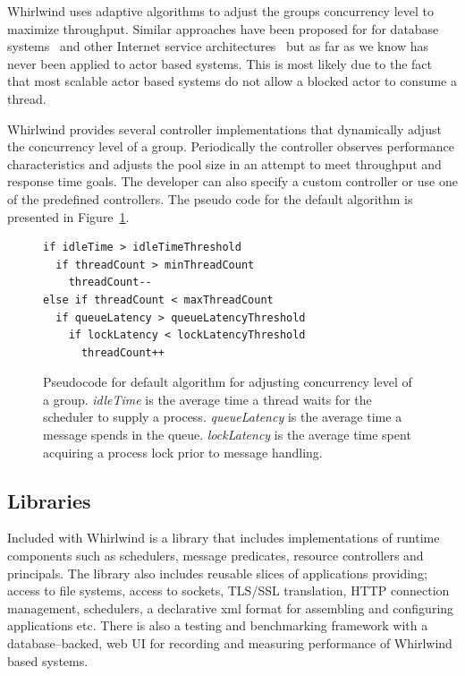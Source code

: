 \documentclass[conference]{IEEEtran}
\begin{document}
Whirlwind uses adaptive algorithms to adjust the groups concurrency level to maximize throughput. Similar approaches have been proposed for for database systems~\cite{Heiss:91:AdaptiveLoadControl} and other Internet service architectures~\cite{welsh03Adaptive} but as far as we know has never been applied to actor based systems. This is most likely due to the fact that most scalable actor based systems do not allow a blocked actor to consume a thread.

Whirlwind provides several controller implementations that dynamically adjust the concurrency level of a group. Periodically the controller observes performance characteristics and adjusts the pool size in an attempt to meet throughput and response time goals. The developer can also specify a custom controller or use one of the predefined controllers. The pseudo code for the default algorithm is presented in Figure~\ref{figure:epc}. 

\begin{figure}[ht]
\begin{verbatim}
if idleTime > idleTimeThreshold
  if threadCount > minThreadCount
    threadCount--
else if threadCount < maxThreadCount
  if queueLatency > queueLatencyThreshold
    if lockLatency < lockLatencyThreshold
      threadCount++
\end{verbatim}
\caption{Pseudocode for default algorithm for adjusting concurrency level of a group. \emph{idleTime} is the average time a thread waits for the scheduler to supply a process. \emph{queueLatency} is the average time a message spends in the queue. \emph{lockLatency} is the average time spent acquiring a process lock prior to message handling.}
\label{figure:epc}
\end{figure} 

\subsection{Libraries}

Included with Whirlwind is a library that includes implementations of runtime components such as schedulers, message predicates, resource controllers and principals. The library also includes reusable slices of applications providing; access to file systems, access to sockets, TLS/SSL translation, HTTP connection management, schedulers, a declarative xml format for assembling and configuring applications etc. There is also a testing and benchmarking framework with a database--backed, web UI for recording and measuring performance of Whirlwind based systems.
\end{document}
